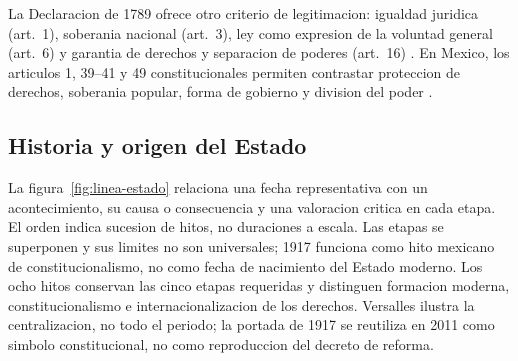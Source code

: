 \documentclass[spanish,letterpaper,oneside]{article}
\begin{document}
La Declaracion de 1789 ofrece otro criterio de legitimacion: igualdad
juridica (art.~1), soberania nacional (art.~3), ley como expresion de la
voluntad general (art.~6) y garantia de derechos y separacion de poderes
(art.~16) \citep{francia1789}. En Mexico, los articulos 1, 39--41 y 49
constitucionales permiten contrastar proteccion de derechos, soberania
popular, forma de gobierno y division del poder
\citep{cpeum2026S2}.

\subsection{Historia y origen del Estado}
La figura~\ref{fig:linea-estado} relaciona una fecha representativa con
un acontecimiento, su causa o consecuencia y una valoracion critica en
cada etapa. El orden indica sucesion de hitos, no duraciones a escala.
Las etapas se superponen y sus limites no son universales; 1917 funciona
como hito mexicano de constitucionalismo, no como fecha de nacimiento
del Estado moderno.
Los ocho hitos conservan las cinco etapas requeridas y distinguen
formacion moderna, constitucionalismo e internacionalizacion de los
derechos. Versalles ilustra la centralizacion, no todo el periodo;
la portada de 1917 se reutiliza en 2011 como simbolo constitucional,
no como reproduccion del decreto de reforma.
\end{document}
